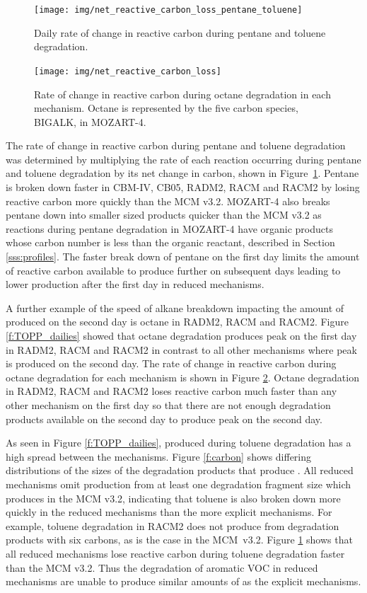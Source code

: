 %
\begin{figure}
    \centering
    \caption{Daily rate of change in reactive carbon during pentane and toluene degradation.}
    \texttt{[image: img/net\_reactive\_carbon\_loss\_pentane\_toluene]}
    \vspace{-2mm}
    \label{f:net_carbon_loss}
\end{figure}
%
\begin{figure}
    \centering
    \caption{Rate of change in reactive carbon during octane degradation in each mechanism. Octane is represented by the five carbon species, BIGALK, in MOZART-4.}
    \texttt{[image: img/net\_reactive\_carbon\_loss]}
    \vspace{-2mm}
    \label{f:octane}
\end{figure}
The rate of change in reactive carbon during pentane and toluene degradation was determined by multiplying the rate of each reaction occurring during pentane and toluene degradation by its net change in carbon, shown in \mbox{Figure \ref{f:net_carbon_loss}}.
Pentane is broken down faster in CBM-IV, CB05, RADM2, RACM and RACM2 by losing reactive carbon more quickly than the MCM v3.2.
MOZART-4 also breaks pentane down into smaller sized products quicker than the MCM v3.2 as reactions during pentane degradation in MOZART-4 have organic products whose carbon number is less than the organic reactant, described in Section \ref{sss:profiles}.
The faster break down of pentane on the first day limits the amount of reactive carbon available to produce further  on subsequent days leading to lower  production after the first day in reduced mechanisms.

A further example of the speed of alkane breakdown impacting the amount of  produced on the second day is octane in RADM2, RACM and RACM2.
Figure \ref{f:TOPP_dailies} showed that octane degradation produces peak  on the first day in RADM2, RACM and RACM2 in contrast to all other mechanisms where peak  is produced on the second day.
The rate of change in reactive carbon during octane degradation for each mechanism is shown in Figure \ref{f:octane}.
Octane degradation in RADM2, RACM and RACM2 loses reactive carbon much faster than any other mechanism on the first day so that there are not enough degradation products available on the second day to produce peak  on the second day.

As seen in Figure \ref{f:TOPP_dailies},  produced during toluene degradation has a high spread between the mechanisms.
Figure \ref{f:carbon} shows differing distributions of the sizes of the degradation products that produce .
All reduced mechanisms omit  production from at least one degradation fragment size which produces  in the MCM v3.2, indicating that toluene is also broken down more quickly in the reduced mechanisms than the more explicit mechanisms.
For example, toluene degradation in RACM2 does not produce  from degradation products with six carbons, as is the case in the \mbox{MCM v3.2}.  
Figure \ref{f:net_carbon_loss} shows that all reduced mechanisms lose reactive carbon during toluene degradation faster than the MCM v3.2.
Thus the degradation of aromatic VOC in reduced mechanisms are unable to produce similar amounts of  as the explicit mechanisms.
